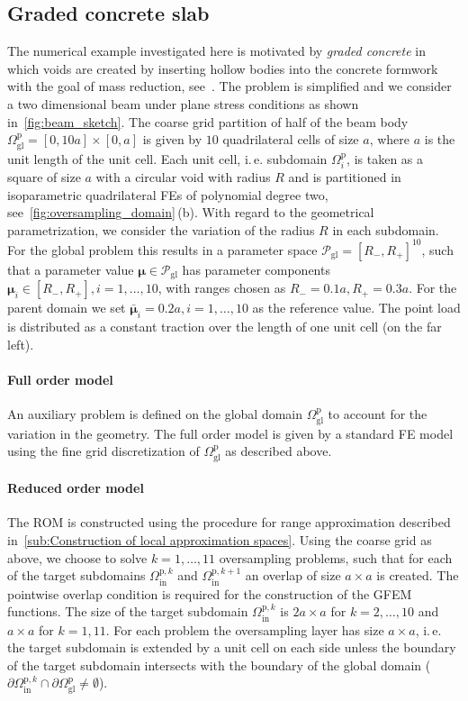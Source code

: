 \documentclass[a4paper]{eccomas_paper-2024}
\makeatletter
\newcommand{\ie}{i.\,e.\@\xspace}
\newcommand{\m}{\bm\mu}
\newcommand{\gl}{\mathrm{gl}}
\newcommand{\p}{\mathrm{p}}
\newcommand{\inrm}{\mathrm{in}}
\makeatother
\begin{document}

\subsection{Graded concrete slab} %
\label{sub:Graded concrete slab}
The numerical example investigated here is motivated by \textit{graded concrete} in which voids are created by inserting hollow bodies into the concrete formwork with the goal of mass reduction, see~\gradientenbetonurl.
The problem is simplified and we consider a two dimensional beam under plane stress conditions as shown in~\cref{fig:beam_sketch}.
The coarse grid partition of half of the beam body $\varOmega^{\p}_{\gl}=[0, 10a]\times[0, a]$ is given by $10$ quadrilateral cells of size $a$, where $a$ is the unit length of the unit cell.
Each unit cell, \ie{} subdomain $\varOmega^{\p}_i$, is taken as a square of size $a$ with a circular void with radius $R$ and is partitioned in  isoparametric quadrilateral FEs of polynomial degree two, see~\cref{fig:oversampling_domain}\,(b).
With regard to the geometrical parametrization, we consider the variation of the radius $R$ in each subdomain.
For the global problem this results in a parameter space $\mathcal{P}_{\gl}=[R_{-}, R_{+}]^{10}$, such that a parameter value $\m\in\mathcal{P}_{\gl}$ has parameter components $\m_i\in[R_{-},R_{+}], i=1, \ldots, 10$, with ranges chosen as $R_{-}=0.1a, R_{+}=0.3a$.
For the parent domain we set $\bar{\m}_i=0.2a, i=1, \ldots, 10$ as the reference value.
The point load is distributed as a constant traction over the length of one unit cell (on the far left).

\paragraph{Full order model}
An auxiliary problem is defined on the global domain $\varOmega^{\p}_{\gl}$ to account for the variation in the geometry.
The full order model is given by a standard FE model using the fine grid discretization of $\varOmega^{\p}_{\gl}$ as described above.

\paragraph{Reduced order model}
The ROM is constructed using the procedure for range approximation described in~\cref{sub:Construction of local approximation spaces}.
Using the coarse grid as above, we choose to solve $k=1, \ldots, 11$ oversampling problems, such that for each of the target subdomains $\varOmega^{\p, k}_{\inrm}$ and $\varOmega^{\p, k+1}_{\inrm}$ an overlap of size $a\times a$ is created.
The pointwise overlap condition is required for the construction of the GFEM functions.
The size of the target subdomain $\varOmega^{\p, k}_{\inrm}$ is $2a \times a$ for $k=2, \ldots, 10$ and $a \times a$ for $k = 1, 11$.
For each problem the oversampling layer has size $a \times a$, \ie{} the target subdomain is extended by a unit cell on each side unless the boundary of the target subdomain intersects with the boundary of the global domain ($\partial\varOmega^{\p,k}_{\inrm}\cap\partial\varOmega^{\p}_{\gl}\ne\emptyset$).
\end{document}
